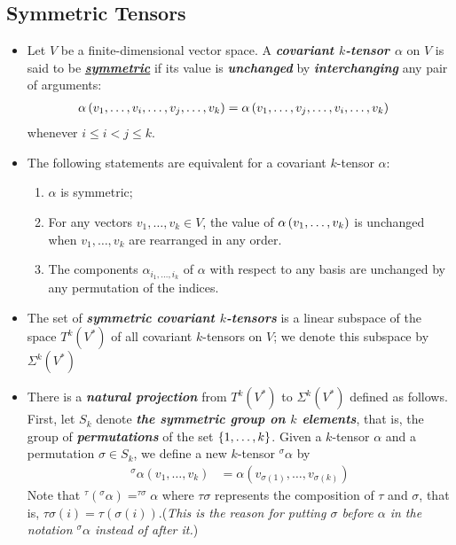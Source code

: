 \documentclass[11pt]{article}
\begin{document}
\subsection{Symmetric Tensors}
\begin{itemize}
\item 
\begin{definition}
Let $V$ be a finite-dimensional vector space. A \emph{\textbf{covariant $k$-tensor $\alpha$}} on $V$ is said to be \underline{\emph{\textbf{symmetric}}} if its value is \textit{\textbf{unchanged}} by \emph{\textbf{interchanging}} any pair of arguments:
\begin{align*}
\alpha\left(v_1, \ldots, v_i, \ldots, v_j, \ldots, v_k\right) &= \alpha\left(v_1, \ldots, v_j, \ldots, v_i, \ldots, v_k\right) 
\end{align*} whenever $i \le i< j \le k$.
\end{definition}

\item 
\begin{remark}
The following statements are equivalent for a covariant $k$-tensor $\alpha$:
\begin{enumerate}
\item $\alpha$ is symmetric;
\item For any vectors $v_1,\ldots,v_k \in V$, the value of $\alpha\left(v_1, \ldots,  v_k\right)$ is unchanged when $v_1,\ldots,v_k$ are rearranged in any order.
\item The components $\alpha_{i_1,\ldots,i_k}$ of $\alpha$ with respect to any basis are unchanged by any permutation of the indices.
\end{enumerate}
\end{remark}


\item \begin{definition}
The set of \emph{\textbf{symmetric covariant $k$-tensors}} is a linear subspace of the space $T^k(V^{*})$ of all covariant $k$-tensors on $V$; we denote this subspace by \underline{$\Sigma^{k}(V^{*})$}
\end{definition}

\item \begin{definition}
There is a \emph{\textbf{natural projection}} from $T^k(V^{*})$ to $\Sigma^{k}(V^{*})$ defined as follows. First, let
$S_k$ denote \emph{\textbf{the symmetric group on $k$ elements}}, that is, the group of \emph{\textbf{permutations}} of the set $\left\{1,\ldots,k\right\}$. Given a $k$-tensor $\alpha$ and a permutation $\sigma \in S_{k}$, we define a new $k$-tensor $^{\sigma}\alpha$ by
\begin{align*}
^{\sigma}\alpha(v_1, \ldots, v_k) &= \alpha(v_{\sigma(1)}, \ldots, v_{\sigma(k)})
\end{align*}
Note that $^{\tau}(^{\sigma}\alpha) = ^{\tau \sigma}\alpha$ where $\tau\sigma$ represents the composition of $\tau$ and $\sigma$, that is, $\tau\sigma(i) = \tau(\sigma(i))$.(\emph{This is the reason for putting $\sigma$ before $\alpha$ in the notation $^{\sigma}\alpha$ instead of after it.}) 


\end{definition}
\end{itemize}
\end{document}
